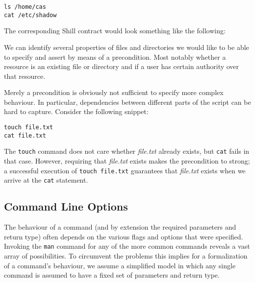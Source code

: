 \documentclass[11pt,a4paper]{article}
\newcommand{\Conid}[1]{\mathit{#1}}
\newcommand{\Varid}[1]{\mathit{#1}}
\def\resethooks{%
  \global\let\SaveRestoreHook\empty
  \global\let\ColumnHook\empty}
\newcommand{\hsindent}[1]{\quad}%
\let\hspre\empty
\let\hspost\empty
\begin{document}
\begin{verbatim}
ls /home/cas 
cat /etc/shadow 
\end{verbatim}

The corresponding Shill contract would look something like the following: 

\resethooks

We can identify several properties of files and directories we would like to be able to specify and assert by means of a precondition. Most notably whether a resource is an existing file or directory and if a user has certain authority over that resource. 

Merely a precondition is obviously not sufficient to specify more complex behaviour. In particular, dependencies between different parts of the script can be hard to capture. Consider the following snippet: 

\begin{verbatim}
touch file.txt 
cat file.txt
\end{verbatim}

The \texttt{touch} command does not care whether \textit{file.txt} already exists, but \texttt{cat} fails in that case. However, requiring that \textit{file.txt} exists makes the precondition to strong; a successful execution of \texttt{touch file.txt} guarantees that \textit{file.txt} exists when we arrive at the \texttt{cat} statement. 

\subsection{Command Line Options}
The behaviour of a command (and by extension the required parameters and return type) often depends on the various flags and options that were specified. Invoking the \texttt{man} command for any of the more common commands reveals a vast array of possibilities. To circumvent the problems this implies for a formalization of a command's behaviour, we assume a simplified model in which any single command is assumed to have a fixed set of parameters and return type. 
\end{document}
